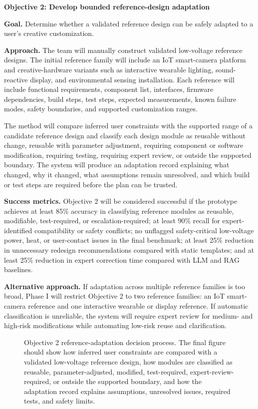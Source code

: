 \textbf{Objective 2: Develop bounded reference-design adaptation}

\textbf{Goal.} Determine whether a validated reference design can be safely adapted to a user's creative customization.

\textbf{Approach.} The team will manually construct validated low-voltage reference designs. The initial reference family will include an IoT smart-camera platform and creative-hardware variants such as interactive wearable lighting, sound-reactive display, and environmental sensing installation. Each reference will include functional requirements, component list, interfaces, firmware dependencies, build steps, test steps, expected measurements, known failure modes, safety boundaries, and supported customization ranges.

The method will compare inferred user constraints with the supported range of a candidate reference design and classify each design module as reusable without change, reusable with parameter adjustment, requiring component or software modification, requiring testing, requiring expert review, or outside the supported boundary. The system will produce an adaptation record explaining what changed, why it changed, what assumptions remain unresolved, and which build or test steps are required before the plan can be trusted.

\textbf{Success metrics.} Objective 2 will be considered successful if the prototype achieves at least 85\% accuracy in classifying reference modules as reusable, modifiable, test-required, or escalation-required; at least 90\% recall for expert-identified compatibility or safety conflicts; no unflagged safety-critical low-voltage power, heat, or user-contact issues in the final benchmark; at least 25\% reduction in unnecessary redesign recommendations compared with static templates; and at least 25\% reduction in expert correction time compared with LLM and RAG baselines.

\textbf{Alternative approach.} If adaptation across multiple reference families is too broad, Phase I will restrict Objective 2 to two reference families: an IoT smart-camera reference and one interactive wearable or display reference. If automatic classification is unreliable, the system will require expert review for medium- and high-risk modifications while automating low-risk reuse and clarification.

\begin{figure}[H]
\centering
{}
\caption{Objective 2 reference-adaptation decision process. The final figure should show how inferred user constraints are compared with a validated low-voltage reference design, how modules are classified as reusable, parameter-adjusted, modified, test-required, expert-review-required, or outside the supported boundary, and how the adaptation record explains assumptions, unresolved issues, required tests, and safety limits.}
\label{fig:objective2_reference_adaptation}
\end{figure}


